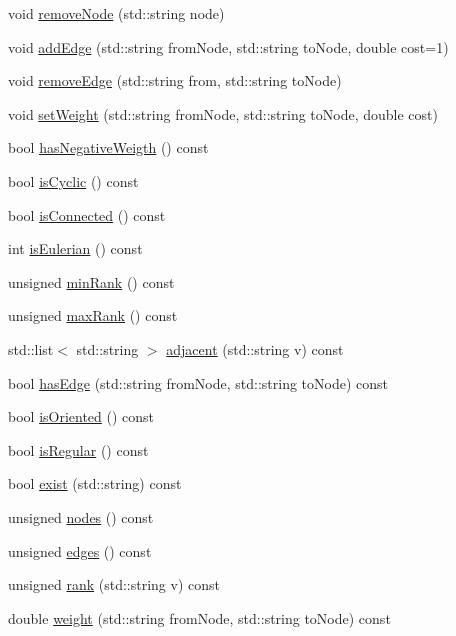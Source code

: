\begin{DoxyCompactItemize}
\item 
void \hyperlink{classGraphLib_1_1Graph_a7778be8b7825051f98f5c6c153ed5cdd}{remove\-Node} (std\-::string node)
\item 
void \hyperlink{classGraphLib_1_1Graph_aafa1c9cea0ead3b9fd86cd3412292b04}{add\-Edge} (std\-::string from\-Node, std\-::string to\-Node, double cost=1)
\item 
void \hyperlink{classGraphLib_1_1Graph_ad6a547a81811de907718a19626676792}{remove\-Edge} (std\-::string from, std\-::string to\-Node)
\item 
void \hyperlink{classGraphLib_1_1Graph_ad3df43d166c11ab232df2ffc2bce0061}{set\-Weight} (std\-::string from\-Node, std\-::string to\-Node, double cost)
\item 
bool \hyperlink{classGraphLib_1_1Graph_afd4a29620eb446ca0e60570e6f51a74c}{has\-Negative\-Weigth} () const 
\item 
bool \hyperlink{classGraphLib_1_1Graph_a984015330b5d479b889c682f5e82eae6}{is\-Cyclic} () const 
\item 
bool \hyperlink{classGraphLib_1_1Graph_ae5ba611a8459d44582ac8fbc6ae5ead9}{is\-Connected} () const 
\item 
int \hyperlink{classGraphLib_1_1Graph_a9daacbca8eda74a7cfd52945f56aa9c1}{is\-Eulerian} () const 
\item 
unsigned \hyperlink{classGraphLib_1_1Graph_a12fe59e5f0093c54da5a3edd5a0325d2}{min\-Rank} () const 
\item 
unsigned \hyperlink{classGraphLib_1_1Graph_a5f669ac551693108e3e2e7d4e6ce4ce8}{max\-Rank} () const 
\item 
std\-::list$<$ std\-::string $>$ \hyperlink{classGraphLib_1_1Graph_a239da990d0825846c3d35cb335e73f9b}{adjacent} (std\-::string v) const 
\item 
bool \hyperlink{classGraphLib_1_1Graph_a26a80e24fced1df4d16f6cc25011d305}{has\-Edge} (std\-::string from\-Node, std\-::string to\-Node) const 
\item 
bool \hyperlink{classGraphLib_1_1Graph_a8d1e2caf0e7b2cea51e597e92c261d4b}{is\-Oriented} () const 
\item 
bool \hyperlink{classGraphLib_1_1Graph_aa363cde930f878c12f9d3b7988c36f4a}{is\-Regular} () const 
\item 
bool \hyperlink{classGraphLib_1_1Graph_a6b7b1c9c7e68d8c9521bf5c1ca27cb8f}{exist} (std\-::string) const 
\item 
unsigned \hyperlink{classGraphLib_1_1Graph_a8f1efe623ea56a32bec0745f45128707}{nodes} () const 
\item 
unsigned \hyperlink{classGraphLib_1_1Graph_a845a9101abc3efff7ed310cc2fa756e7}{edges} () const 
\item 
unsigned \hyperlink{classGraphLib_1_1Graph_aa449a0e9c519f3e8add063e4c26c63f7}{rank} (std\-::string v) const 
\item 
double \hyperlink{classGraphLib_1_1Graph_a4139dd37d2c30e975c506f1f57a3d6ff}{weight} (std\-::string from\-Node, std\-::string to\-Node) const 
\end{DoxyCompactItemize}
